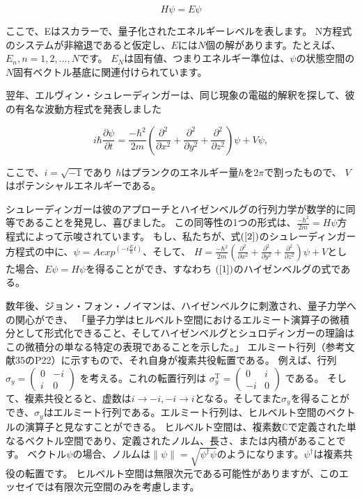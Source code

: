 \begin{equation}
\label{1}
H \psi = E \psi
\end{equation}

ここで、Eはスカラーで、量子化されたエネルギーレベルを表します。
N方程式のシステムが非縮退であると仮定し、$E$には$N$個の解があります。たとえば、$E_n, n = 1,2,...,N$です。
$E_N$は固有値、つまりエネルギー準位は、$\psi$の状態空間の$N$固有ベクトル基底に関連付けられています。

翌年、エルヴィン・シュレーディンガーは、同じ現象の電磁的解釈を探して、彼の有名な波動方程式を発表しました

\begin{equation}
\label{2}
i \hbar \frac{\partial \psi}{\partial t} 
= \frac{- \hbar^2}{2m}
\left(    
\frac{\partial^2}{\partial x^2} + \frac{\partial^2}{\partial y^2} + \frac{\partial^2}{\partial z^2}   
\right) \psi + V \psi,
\end{equation}

ここで、$ i = \sqrt{-1} $であり $\hbar$はプランクのエネルギー量$h$を$2 \pi$で割ったもので、
$V$はポテンシャルエネルギーである。

シュレーディンガーは彼のアプローチとハイゼンベルグの行列力学が数学的に同等であることを発見し、喜びました。
この同等性の1つの形式は、$\frac{- \hbar^2}{2m} = H \psi$方程式によって示唆されています。
もし、私たちが、式$(\ref{2})$のシュレーディンガー方程式の中に、$\psi = A exp^{(-i \frac{E}{\hbar}t)}$、そして、
$ H = \frac{- \hbar^2}{2m}
\left(    
\frac{\partial^2}{\partial x^2} + \frac{\partial^2}{\partial y^2} + \frac{\partial^2}{\partial z^2}   
\right) \psi + V $とした場合、$ E \psi = H \psi $を得ることができ、すなわち $(\ref{1})$のハイゼンベルグの式である。

数年後、ジョン・フォン・ノイマンは、ハイゼンベルクに刺激され、量子力学への関心ができ、
「量子力学はヒルベルト空間におけるエルミート演算子の微積分として形式化できること、そしてハイゼンベルグとシュロディンガーの理論はこの微積分の単なる特定の表現であることを示した。」 
エルミート行列（参考文献35のP22）に示すもので、それ自身が複素共役転置である。
例えば、行列 $ \sigma_y = \left(  
\begin{array}{ccc}
 0 & -i \\
 i & 0 
\end{array}
\right) $ を考える。これの転置行列は
 $ \sigma_y^{\mathrm{T}} = \left(  
\begin{array}{ccc}
 0 & i \\
 -i & 0 
\end{array}
\right) $ 
である。
そして、複素共役とると、虚数は$i \rightarrow -i, -i \rightarrow i $となる。そしてまた$\sigma_y$を得ることができ、$\sigma_y$はエルミート行列である。エルミート行列は、ヒルベルト空間のベクトルの演算子と見なすことができる。
ヒルベルト空間は、複素数$\mathbb{C}$で定義された単なるベクトル空間であり、定義されたノルム、長さ、または内積があることです。
ベクトル$\psi$の場合、ノルムは$ \parallel \psi \parallel = \sqrt{\psi^{\dagger} \psi} $のようになります。$\psi^{\dagger}$は複素共役の転置です。
ヒルベルト空間は無限次元である可能性がありますが、このエッセイでは有限次元空間のみを考慮します。

